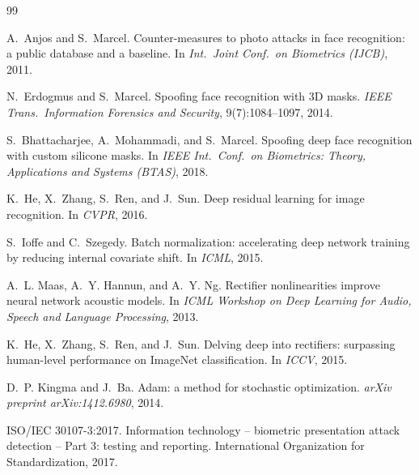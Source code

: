 \documentclass[anonymous, manuscript, screen, review]{acmart}
\begin{document}
\begin{thebibliography}{99}

A.~Anjos and S.~Marcel.
\newblock Counter-measures to photo attacks in face recognition: a public
  database and a baseline.
\newblock In \emph{Int.\ Joint Conf.\ on Biometrics (IJCB)}, 2011.

N.~Erdogmus and S.~Marcel.
\newblock Spoofing face recognition with 3D masks.
\newblock \emph{IEEE Trans.\ Information Forensics and Security}, 9(7):1084--1097, 2014.

S.~Bhattacharjee, A.~Mohammadi, and S.~Marcel.
\newblock Spoofing deep face recognition with custom silicone masks.
\newblock In \emph{IEEE Int.\ Conf.\ on Biometrics: Theory, Applications and Systems (BTAS)}, 2018.

K.~He, X.~Zhang, S.~Ren, and J.~Sun.
\newblock Deep residual learning for image recognition.
\newblock In \emph{CVPR}, 2016.

S.~Ioffe and C.~Szegedy.
\newblock Batch normalization: accelerating deep network training by
  reducing internal covariate shift.
\newblock In \emph{ICML}, 2015.

A.~L. Maas, A.~Y. Hannun, and A.~Y. Ng.
\newblock Rectifier nonlinearities improve neural network acoustic models.
\newblock In \emph{ICML Workshop on Deep Learning for Audio, Speech and Language Processing}, 2013.

K.~He, X.~Zhang, S.~Ren, and J.~Sun.
\newblock Delving deep into rectifiers: surpassing human-level performance
  on ImageNet classification.
\newblock In \emph{ICCV}, 2015.

D.~P. Kingma and J.~Ba.
\newblock Adam: a method for stochastic optimization.
\newblock \emph{arXiv preprint arXiv:1412.6980}, 2014.

ISO/IEC 30107-3:2017.
\newblock Information technology -- biometric presentation attack
  detection -- Part 3: testing and reporting.
\newblock International Organization for Standardization, 2017.

\end{thebibliography}
\end{document}

